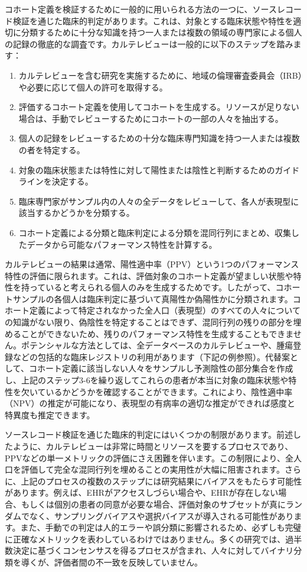 \documentclass[
  11pt]{book}
\providecommand{\tightlist}{%
  \setlength{\itemsep}{0pt}\setlength{\parskip}{0pt}}
\theoremstyle{definition}
\theoremstyle{definition}
\theoremstyle{definition}
\theoremstyle{definition}
\theoremstyle{remark}
\begin{document}

コホート定義を検証するために一般的に用いられる方法の一つに、ソースレコード検証を通じた臨床的判定があります。これは、対象とする臨床状態や特性を適切に分類するために十分な知識を持つ一人または複数の領域の専門家による個人の記録の徹底的な調査です。カルテレビューは一般的に以下のステップを踏みます：

\begin{enumerate}
\def\labelenumi{\arabic{enumi}.}
\tightlist
\item
  カルテレビューを含む研究を実施するために、地域の倫理審査委員会（IRB）や必要に応じて個人の許可を取得する。
\item
  評価するコホート定義を使用してコホートを生成する。リソースが足りない場合は、手動でレビューするためにコホートの一部の人々を抽出する。
\item
  個人の記録をレビューするための十分な臨床専門知識を持つ一人または複数の者を特定する。
\item
  対象の臨床状態または特性に対して陽性または陰性と判断するためのガイドラインを決定する。
\item
  臨床専門家がサンプル内の人々の全データをレビューして、各人が表現型に該当するかどうかを分類する。
\item
  コホート定義による分類と臨床判定による分類を混同行列にまとめ、収集したデータから可能なパフォーマンス特性を計算する。
\end{enumerate}

カルテレビューの結果は通常、陽性適中率（PPV）という1つのパフォーマンス特性の評価に限られます。これは、評価対象のコホート定義が望ましい状態や特性を持っていると考えられる個人のみを生成するためです。したがって、コホートサンプルの各個人は臨床判定に基づいて真陽性か偽陽性かに分類されます。コホート定義によって特定されなかった全人口（表現型）のすべての人々についての知識がない限り、偽陰性を特定することはできず、混同行列の残りの部分を埋めることができないため、残りのパフォーマンス特性を生成することもできません。ポテンシャルな方法としては、全データベースのカルテレビューや、腫瘍登録などの包括的な臨床レジストリの利用があります（下記の例参照）。代替案として、コホート定義に該当しない人々をサンプルし予測陰性の部分集合を作成し、上記のステップ3-6を繰り返してこれらの患者が本当に対象の臨床状態や特性を欠いているかどうかを確認することができます。これにより、陰性適中率（NPV）の推定が可能になり、表現型の有病率の適切な推定ができれば感度と特異度も推定できます。

ソースレコード検証を通じた臨床的判定にはいくつかの制限があります。前述したように、カルテレビューは非常に時間とリソースを要するプロセスであり、PPVなどの単一メトリックの評価にさえ困難を伴います。この制限により、全人口を評価して完全な混同行列を埋めることの実用性が大幅に阻害されます。さらに、上記のプロセスの複数のステップには研究結果にバイアスをもたらす可能性があります。例えば、EHRがアクセスしづらい場合や、EHRが存在しない場合、もしくは個別の患者の同意が必要な場合、評価対象のサブセットが真にランダムでなく、サンプリングバイアスや選択バイアスが導入される可能性があります。また、手動での判定は人的エラーや誤分類に影響されるため、必ずしも完璧に正確なメトリックを表わしているわけではありません。多くの研究では、過半数決定に基づくコンセンサスを得るプロセスが含まれ、人々に対してバイナリ分類を導くが、評価者間の不一致を反映していません。
\end{document}
